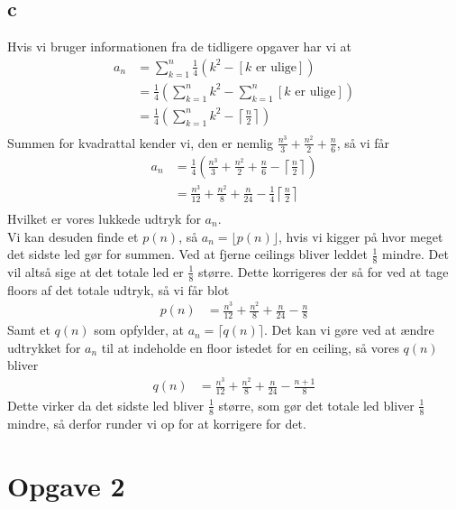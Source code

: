\documentclass[12pt]{article}
\begin{document}
\subsection*{c}
Hvis vi bruger informationen fra de tidligere opgaver har vi at
\begin{align*}
a_n&=\sum_{k=1}^n \frac{1}{4}(k^2-[k \mbox{ er ulige}]) \\
&=\frac{1}{4}\left(\sum_{k=1}^n k^2 - \sum_{k=1}^n [k \mbox{ er ulige}]\right) \\
&=\frac{1}{4}\left(\sum_{k=1}^n k^2 -  \left\lceil \frac{n}{2} \right\rceil\right) \\
\end{align*}
Summen for kvadrattal kender vi, den er nemlig $\frac{n^3}{3}+\frac{n^2}{2}+\frac{n}{6}$, så vi får
\begin{align*}
a_n&=\frac{1}{4}\left (\frac{n^3}{3}+\frac{n^2}{2}+\frac{n}{6} -  \left\lceil \frac{n}{2} \right\rceil\right ) \\
&=\frac{n^3}{12}+\frac{n^2}{8}+\frac{n}{24} -  \frac{1}{4}\left\lceil \frac{n}{2} \right\rceil \\
\end{align*}
Hvilket er vores lukkede udtryk for $a_n$. \\
Vi kan desuden finde et $p(n)$, så $a_n=\lfloor p(n) \rfloor$, hvis vi kigger på hvor meget det sidste led gør for summen. Ved at fjerne ceilings bliver leddet $\frac{1}{8}$ mindre. Det vil altså sige at det totale led er $\frac{1}{8}$ større. Dette korrigeres der så for ved at tage floors af det totale udtryk, så vi får blot
\begin{align*}
p(n)&=\frac{n^3}{12}+\frac{n^2}{8}+\frac{n}{24} -  \frac{n}{8}
\end{align*}
Samt et $q(n)$ som opfylder, at $a_n=\lceil q(n) \rceil$. Det kan vi gøre ved at ændre udtrykket for $a_n$ til at indeholde en floor istedet for en ceiling, så vores $q(n)$ bliver
\begin{align*}
q(n)&=\frac{n^3}{12}+\frac{n^2}{8}+\frac{n}{24} -  \frac{n+1}{8}
\end{align*}
Dette virker da det sidste led bliver $\frac{1}{8}$ større, som gør det totale led bliver $\frac{1}{8}$ mindre, så derfor runder vi op for at korrigere for det.

\section*{Opgave 2}
\end{document}
